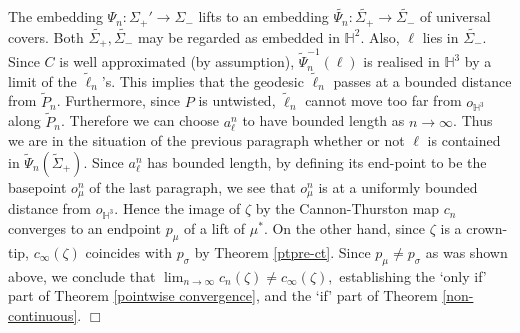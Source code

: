 \documentclass{amsart}
\theoremstyle{definition}
\newcommand\HHH{{\mathbb H}}
\newcommand\til{\widetilde}
\begin{document}
%
%
The embedding $\Psi_n: \Sigma_+' \to \Sigma_-$ lifts to an embedding $\til{\Psi_n}: \til{\Sigma_+} \to  \til{\Sigma_-}$ of  universal covers. Both $\til{\Sigma_+},  \til{\Sigma_-}$ may be regarded as embedded in $\HHH^2$. Also,   $\ell$ lies in $\til{\Sigma_-}$.
Since $C$ is well approximated (by assumption),  $\til \Psi_n^{-1}(\ell)$ is realised in $\HHH^3$ by a limit of the $\til \ell_n$'s.
This implies that the geodesic $\til \ell_n$ passes at a bounded distance  from $\til P_n$.
Furthermore, since $P$ is untwisted, $\til \ell_n$ cannot move too far from $o_{\HHH^3}$ along $\til P_n$.
Therefore we can choose $a^n_\ell$ to have bounded length as $n \rightarrow \infty$.
Thus we are in the situation of the previous paragraph whether or not $\ell$ is contained in $\til \Psi_n(\til \Sigma_+)$.
Since $a^n_\ell$ has bounded length, by defining its end-point to be the basepoint $o_\mu^n$ of the last paragraph, we see that $o_\mu^n$  is at a uniformly bounded distance from $o_{\HHH^3}$. Hence the image of $\zeta$ by the Cannon-Thurston map $c_n$ converges to an endpoint $p_\mu$ of a lift of $\mu^\ast$.
On the other hand, since $\zeta$ is a crown-tip,  $c_\infty(\zeta)$ coincides with 
 $p_\sigma$ by Theorem \ref{ptpre-ct}. Since
$p_\mu \neq p_\sigma$ as was shown above, we conclude  that $\lim_{n\to \infty} c_n(\zeta) \neq c_\infty (\zeta),$  establishing the \lq only if' part of Theorem \ref{pointwise convergence}, and  the \lq if' part of Theorem \ref{non-continuous}. $\Box$
\end{document}
